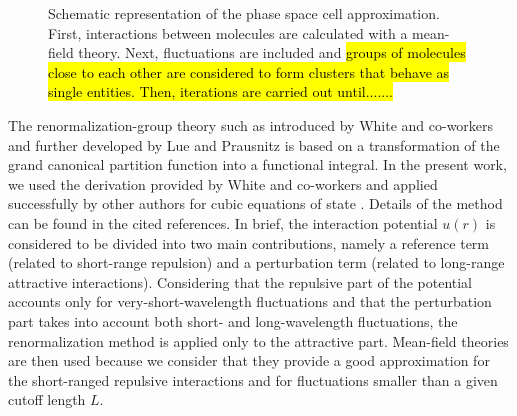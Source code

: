 \documentclass[preprint,12pt,3p]{elsarticle}
\begin{document}
\begin{figure}[!ht]
\centering
\captionsetup{justification=centering}
\caption{Schematic representation of the phase space cell approximation. First, interactions between molecules are calculated with a mean-field theory. Next, fluctuations are included and \hl{groups of molecules close to each other are considered to form clusters that behave as single entities. Then, iterations are carried out until.......}}
\label{fig:schematics}
\end{figure}

The renormalization-group theory such as introduced by White and co-workers \cite{white1993renormalization,white1995renormalization,white1998renormalization} and further developed by Lue and Prausnitz \cite{lue1998renormalization, lue1998brenormalization} is based on a transformation of the grand canonical partition function into a functional integral.
In the present work, we used the derivation provided by White and co-workers \cite{white1993renormalization,white1995renormalization,white1998renormalization} and applied successfully by other authors for cubic equations of state \cite{cai2006vapor,pcm2017application,xu2010crossover,xu2011prediction}. Details of the method can be found in the cited references.
In brief, the interaction potential $u(r)$ is considered to be divided into two main contributions, namely a reference term (related to short-range repulsion) and a perturbation term (related to long-range attractive interactions).
Considering that the repulsive part of the potential accounts only for very-short-wavelength fluctuations and that the perturbation part takes into account both short- and long-wavelength fluctuations, the renormalization method is applied only to the attractive part.
Mean-field theories are then used because we consider that they provide a good approximation for the short-ranged repulsive interactions and for fluctuations smaller than a given cutoff length $L$.
\end{document}
